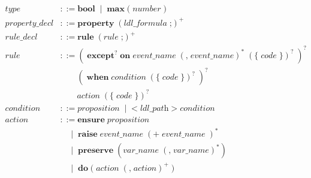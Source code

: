 \documentclass[preview=true]{standalone}
\newcommand{\token}[1]{\textbf{#1}}
\begin{document}
\begin{table}[t]
\begin{align*}
  \textit{type} &::=
    \token{bool}\;
    \mid\; \token{max}\; \texttt{(}\; \textit{number}\; \texttt{)}
  \\
  \textit{property\_decl} &::=
  \token{property}\;
  \left(\textit{ldl\_formula}\; \texttt{;}\right)^+
  \\
  \textit{rule\_decl} &::= \token{rule}\;
  \left(\textit{rule}\; \texttt{;}\right)^+
  \\
  \textit{rule} &::=
  \left(\;
  \token{except}^?\; \token{on}\; \textit{event\_name}\;
  \left(\texttt{,}\; \textit{event\_name}\right)^\ast\;
  \left( \token{\{}\; \textit{code}\; \token{\}} \right)^?\;
  \right)^?\;
  \\&\qquad
  \left(\;
  \token{when}\; \textit{condition}\;
  \left( \token{\{}\; \textit{code}\; \token{\}} \right)^?\;
  \right)^?
  \\&\qquad
  \textit{action}\;
  \left( \token{\{}\; \textit{code}\; \token{\}} \right)^?\;
  \\
  \textit{condition} &::= \textit{proposition}\;
  \mid\;
  \texttt{<}\; \textit{ldl\_path}\; \texttt{>}\; \textit{condition}
  \\
  \textit{action} &::=
  \token{ensure}\; \textit{proposition}
  \\&\quad
  \mid\;
  \token{raise}\; \textit{event\_name}\; \left(\texttt{+}\; \textit{event\_name}\; \right)^\ast
  \\&\quad
  \mid\;
  \token{preserve}\; (\textit{var\_name}\; (\texttt{,}\; \textit{var\_name})^\ast)
  \\&\quad
  \mid\;
  \token{do}\;
    \texttt{(}\;
    \textit{action}\; \left(\texttt{,}\; \textit{action}\right)^+\;
    \texttt{)}
\end{align*}
\end{table}
\smallskip
\end{document}
